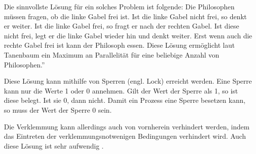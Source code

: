 Die sinnvollste Lösung für ein solches Problem ist folgende: Die Philosophen müssen fragen, ob die linke Gabel frei ist. Ist die linke Gabel nicht frei, so denkt er weiter. Ist die linke Gabel frei, so fragt er nach der rechten Gabel. Ist diese nicht frei, legt er die linke Gabel wieder hin und denkt weiter. Erst wenn auch die rechte Gabel frei ist kann der Philosoph essen. Diese Lösung ermöglicht laut Tanenbaum \glqq ein Maximum an Parallelität für eine beliebige Anzahl von Philosophen.''\parencite[S.222]{tanenbaum2016}

Diese Lösung kann mithilfe von Sperren (engl. Lock) erreicht werden. Eine Sperre kann nur die Werte 1 oder 0 annehmen. Gilt der Wert der Sperre als 1, so ist diese belegt. Ist sie 0, dann nicht. Damit ein Prozess eine Sperre besetzen kann, so muss der Wert der Sperre 0 sein\parencite[vgl.][S.148]{mandl2020}.

Die Verklemmung kann allerdings auch von vornherein verhindert werden, indem das Eintreten der verklemmungsnotwenigen Bedingungen verhindert wird. Auch diese Lösung ist sehr aufwendig \parencite[vgl. ][S.79]{mandl2020}.

















